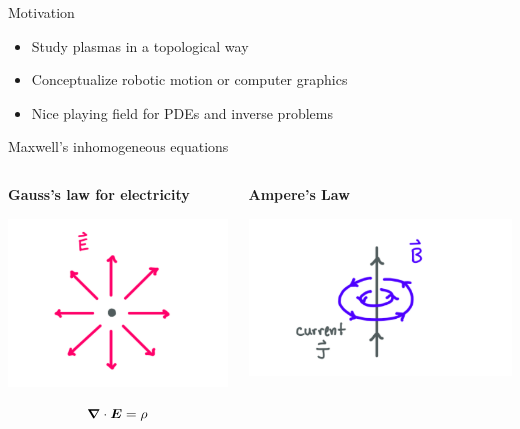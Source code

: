 \documentclass[aspectratio=169]{beamer}
\begin{document}
\begin{frame}{Motivation}
\vfill
\begin{itemize}
\item Study plasmas in a topological way
\item Conceptualize robotic motion or computer graphics
\item Nice playing field for PDEs and inverse problems
\end{itemize}
\vfill
\end{frame}

\begin{frame}{Maxwell's inhomogeneous equations}
    \begin{columns}[c] 

    
    \begin{center} \textbf{Gauss's law for electricity}
    
    \includegraphics[scale=.55]{figures/gauss_i.png}
    \vspace*{-10mm}
    
    $$ \boldsymbol{\nabla}\cdot \boldsymbol{E} = \rho $$
    
    
    \end{center}
    
    
    \begin{center}
    
    \textbf{Ampere's Law}
    
    \includegraphics[scale=.6]{figures/ampere.png}
    

\end{center}
\end{columns}
\end{frame}
\end{document}
